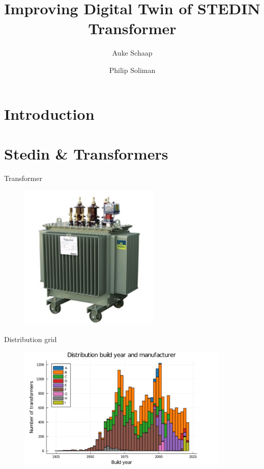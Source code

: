 \documentclass[aspectratio=43]{beamer}
\title[]{Improving Digital Twin of STEDIN Transformer}
\institute[]{Delft University of Technology, The Netherlands}
\author{Auke Schaap \and Philip Soliman}
\date{}
\begin{document}
\section{Introduction}
{
\frame{\titlepage}
}

\section{Stedin & Transformers}
\begin{frame}[fragile]{Transformer} %
\begin{figure}
    \centering
    \includegraphics[width=0.6\textwidth]{figures/transformer.png}
    \label{fig:my_label1}
\end{figure}
\end{frame}

\begin{frame}[fragile]{Distribution grid} %
\begin{figure}
    \centering
    \includegraphics[width=0.9\textwidth]{figures/stedin_transformers_build_year.png}
    \label{fig:my_label2}
\end{figure}
\end{frame}
\end{document}
